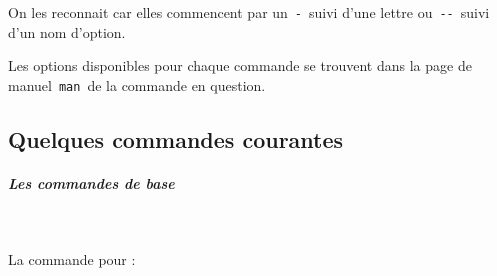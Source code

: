 \documentclass[11pt,a4paper]{article}
\begin{document}
            \par
        
				  On les reconnait car elles commencent par un \,\verb|-|\, suivi d'une lettre
          ou \,\verb|--|\, suivi d'un nom d'option.
        
            \par
        
          Les options disponibles pour chaque commande se trouvent dans la page de manuel \,\verb|man|\, 
          de la commande en question.
				
            \par
        \subsection{Quelques commandes courantes}
			
		\subparagraph{Les commandes de base} 
		
                \textcolor{white}{.} \par
             
								La commande pour :  
							
\end{document}
